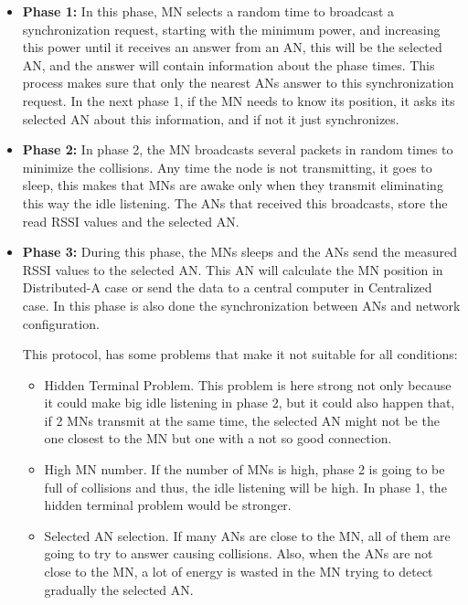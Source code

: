 \begin{itemize}
 \item \textbf{Phase 1:} In this phase, \ac{MN} selects a random time to broadcast a synchronization request, starting with the minimum power,
and increasing this power until it receives an answer from an \ac{AN}, this will be the selected \ac{AN}, and the answer will contain information
about the phase times. This process makes sure that only the nearest \acp{AN} answer to this synchronization request. In the next phase 1, if 
the \ac{MN} needs to know its position, it asks its selected \ac{AN} about this information, and if not it just synchronizes.
 \item \textbf{Phase 2:} In phase 2, the \ac{MN} broadcasts several packets in random times to minimize the collisions. Any time the node is not
transmitting, it goes to sleep, this makes that \acp{MN} are awake only when they transmit eliminating this way the idle listening. The \acp{AN} that
received this broadcasts, store the read \ac{RSSI} values and the selected \ac{AN}.
 \item \textbf{Phase 3:} During this phase, the \acp{MN} sleeps and the \acp{AN} send the measured \ac{RSSI} values to the selected \ac{AN}. 
This \ac{AN} will calculate the \ac{MN} position in Distributed-A case or send the data to a central computer in Centralized case. In this phase is
also done the synchronization between \acp{AN} and network configuration.

This protocol, has some problems that make it not suitable for all conditions:

\begin{itemize}
 \item Hidden Terminal Problem. This problem is here strong not only because it could make big idle listening in phase 2, but it could also 
happen that, if 2 \acp{MN} transmit at the same time, the selected \ac{AN} might not be the one closest to the \ac{MN} but one with a not so 
good connection.
 \item High \ac{MN} number. If the number of \acp{MN} is high, phase 2 is going to be full of collisions and thus, the idle listening will be
high. In phase 1, the hidden terminal problem would be stronger.
 \item Selected \ac{AN} selection. If many \acp{AN} are close to the \ac{MN}, all of them are going to try to answer causing collisions. Also, 
when the \acp{AN} are not close to the \ac{MN}, a lot of energy is wasted in the \ac{MN} trying to detect gradually the selected \ac{AN}.
\end{itemize}


\end{itemize}


